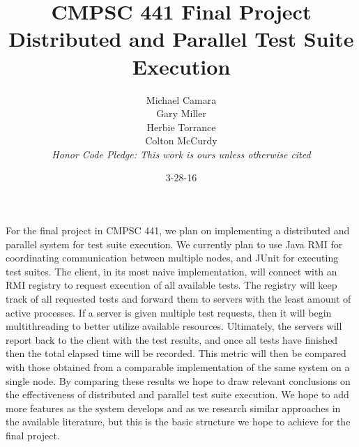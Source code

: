 \documentclass[12pt]{article}
\begin{document}
\title{CMPSC 441 Final Project\\Distributed and Parallel Test Suite Execution}
\author{Michael Camara\\Gary Miller\\Herbie Torrance\\Colton McCurdy\\\textit{Honor Code Pledge: This work is ours unless otherwise cited}}
\date{3-28-16}
\maketitle

For the final project in CMPSC 441, we plan on implementing a distributed and parallel system for test suite execution.  We currently plan to use Java RMI for coordinating communication between multiple nodes, and JUnit for executing test suites.  The client, in its most naive implementation, will connect with an RMI registry to request execution of all available tests.  The registry will keep track of all requested tests and forward them to servers with the least amount of active processes.  If a server is given multiple test requests, then it will begin multithreading to better utilize available resources.  Ultimately, the servers will report back to the client with the test results, and once all tests have finished then the total elapsed time will be recorded.  This metric will then be compared with those obtained from a comparable implementation of the same system on a single node.  By comparing these results we hope to draw relevant conclusions on the effectiveness of distributed and parallel test suite execution.  We hope to add more features as the system develops and as we research similar approaches in the available literature, but this is the basic structure we hope to achieve for the final project.
\end{document}
